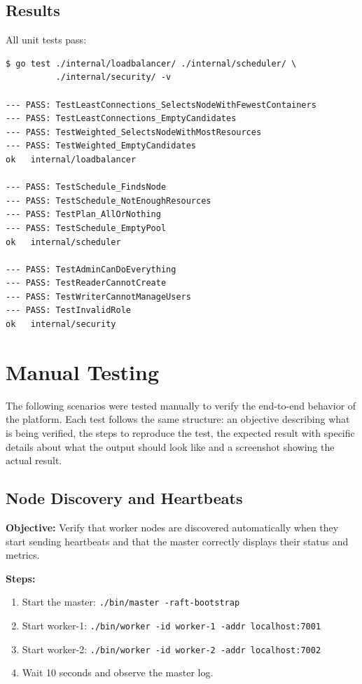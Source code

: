 \subsection{Results}

All unit tests pass:

\begin{verbatim}
$ go test ./internal/loadbalancer/ ./internal/scheduler/ \
          ./internal/security/ -v

--- PASS: TestLeastConnections_SelectsNodeWithFewestContainers
--- PASS: TestLeastConnections_EmptyCandidates
--- PASS: TestWeighted_SelectsNodeWithMostResources
--- PASS: TestWeighted_EmptyCandidates
ok   internal/loadbalancer

--- PASS: TestSchedule_FindsNode
--- PASS: TestSchedule_NotEnoughResources
--- PASS: TestPlan_AllOrNothing
--- PASS: TestSchedule_EmptyPool
ok   internal/scheduler

--- PASS: TestAdminCanDoEverything
--- PASS: TestReaderCannotCreate
--- PASS: TestWriterCannotManageUsers
--- PASS: TestInvalidRole
ok   internal/security
\end{verbatim}

\section{Manual Testing}

The following scenarios were tested manually to verify the end-to-end behavior of the platform. Each test follows the same structure: an objective describing what is being verified, the steps to reproduce the test, the expected result with specific details about what the output should look like and a screenshot showing the actual result.

\subsection{Node Discovery and Heartbeats}

\textbf{Objective:} Verify that worker nodes are discovered automatically when they start sending heartbeats and that the master correctly displays their status and metrics.

\textbf{Steps:}
\begin{enumerate}
    \item Start the master: \texttt{./bin/master -raft-bootstrap}
    \item Start worker-1: \texttt{./bin/worker -id worker-1 -addr localhost:7001}
    \item Start worker-2: \texttt{./bin/worker -id worker-2 -addr localhost:7002}
    \item Wait 10 seconds and observe the master log.
\end{enumerate}


